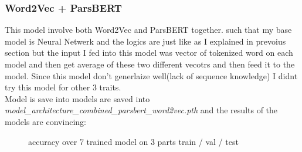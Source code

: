 \documentclass[10pt, a4paper]{article}
\begin{document}
\subsubsection{Word2Vec + ParsBERT}
This model involve both Word2Vec and ParsBERT together. such that my base model is Neural Netwerk and the logics are just like as I explained in prevoius section but the input I fed into this model
was vector of tokenized word on each model and then get average of these two different vecotrs and then feed it to the model. Since this model don't generlaize well(lack of sequence knowledge) I didnt try this model for other 3 traits.
\\
Model is save into models are saved into \textit{model\_architecture\_combined\_parsbert\_word2vec.pth} and the results of the models are convincing:
\begin{figure}[H]
    \centering
    \hfill %
    \caption{accuracy over 7 trained model on 3 parts train / val / test}
\end{figure}
\end{document}
